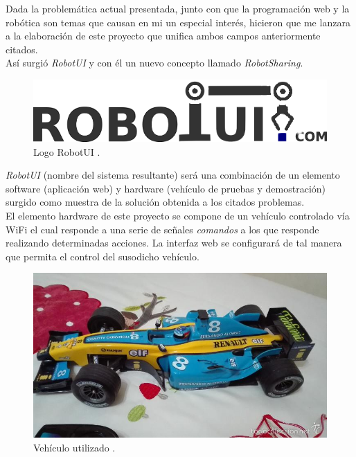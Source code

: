 Dada la problemática actual presentada, junto con que la programación web y la robótica son temas que causan en mi un especial interés, hicieron que me lanzara a la elaboración de este proyecto que unifica ambos campos anteriormente citados.\\

Así surgió \emph{RobotUI} y con él un nuevo concepto llamado \textit{RobotSharing}.\\

\begin{figure}[H]
  \begin{center}
    \includegraphics[scale=0.3]{imagenes/logotipo.png}
  \end{center}
  \label{fig:logo}
 \caption{Logo RobotUI \protect\footnotemark.}
\end{figure}


\emph{RobotUI} (nombre del sistema resultante) será una combinación de un elemento software (aplicación web) y hardware (vehículo de pruebas y demostración) surgido como muestra de la solución obtenida a los citados problemas.\\


El elemento hardware de este proyecto se compone de un vehículo controlado vía WiFi el cual responde a una serie de señales \emph{comandos} a los que responde realizando determinadas acciones. La interfaz web se configurará de tal manera que permita el control del susodicho vehículo.\\

\begin{figure}[H]
  \begin{center}
    \includegraphics[scale=0.3]{imagenes/f1.jpg}
  \end{center}
  \label{fig:logo}
 \caption{Vehículo utilizado \protect\footnotemark.}
\end{figure}

